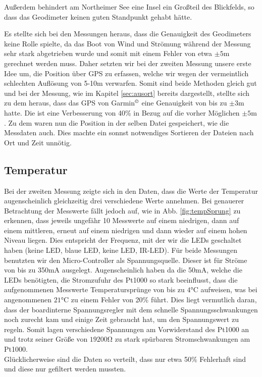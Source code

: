 \documentclass[12pt,a4paper,titlepage,headinclude,bibtotoc]{scrartcl}
\numberwithin{equation}{subsection}
\begin{document}
Außerdem behindert am Northeimer See eine Insel ein Großteil des Blickfelds, so dass das Geodimeter keinen guten Standpunkt gehabt hätte.

Es stellte sich bei den Messungen heraus, dass die Genauigkeit des Geodimeters keine Rolle spielte, da das Boot von Wind und Strömung während der Messung sehr stark abgetrieben wurde und somit mit einem Fehler von etwa $\pm5\si{\meter}$ gerechnet werden muss.
Daher setzten wir bei der zweiten Messung unsere erste Idee um, die Position über GPS zu erfassen, welche wir wegen der vermeintlich schlechten Auflösung von 5-10m verwarfen.
Somit sind beide Methoden gleich gut und bei der Messung, wie im Kapitel \ref{sec:ausort} bereits dargestellt, stellte sich zu dem heraus, dass das GPS von Garmin$^\copyright$ eine Genauigkeit von bis zu $\pm3\si{\meter}$ hatte.
Die ist eine Verbesserung von 40\% in Bezug auf die vorher Möglichen $\pm5\si{\meter}$.
Zu dem waren nun die Position in der selben Datei gespeichert, wie die Messdaten auch.
Dies machte ein sonnst notwendiges Sortieren der Dateien nach Ort und Zeit unnötig.

\subsection{Temperatur}
Bei der zweiten Messung zeigte sich in den Daten, dass die Werte der Temperatur augenscheinlich gleichzeitig drei verschiedene Werte annehmen.
Bei genauerer Betrachtung der Messwerte fällt jedoch auf, wie in Abb. \ref{fig:tempSprung} zu erkennen, dass jeweils ungefähr 10 Messwerte auf einem niedrigen, dann auf einem mittleren, erneut auf einem niedrigen und dann wieder auf einem hohen Niveau liegen.
Dies entspricht der Frequenz, mit der wir die LEDs geschaltet haben (keine LED, blaue LED, keine LED, IR-LED).
Für beide Messungen benutzten wir den Micro-Controller als Spannungsquelle.
Dieser ist für Ströme von bis zu 350mA ausgelegt.
Augenscheinlich haben da die 50mA, welche die LEDs benötigten, die Stromzufuhr des Pt1000 so stark beeinflusst, dass die aufgenommenen Messwerte Temperatursprünge von bis zu $4\si{\celsius}$ aufweisen, was bei angenommenen $21\si{\celsius}$ zu einem Fehler von 20\% führt.
Dies liegt vermutlich daran, dass der boardinterne Spannungsregler mit dem schnelle Spannungsschwankungen noch zurecht kam und einige Zeit gebraucht hat, um den Spannungswert zu regeln.
Somit lagen verschiedene Spannungen am Vorwiderstand des Pt1000 an und trotz seiner Größe von $19200\si{\ohm}$ zu stark spürbaren Stromschwankungen am Pt1000.\\
Glücklicherweise sind die Daten so verteilt, dass nur etwa 50\% Fehlerhaft sind und diese nur gefiltert werden mussten.
\end{document}
